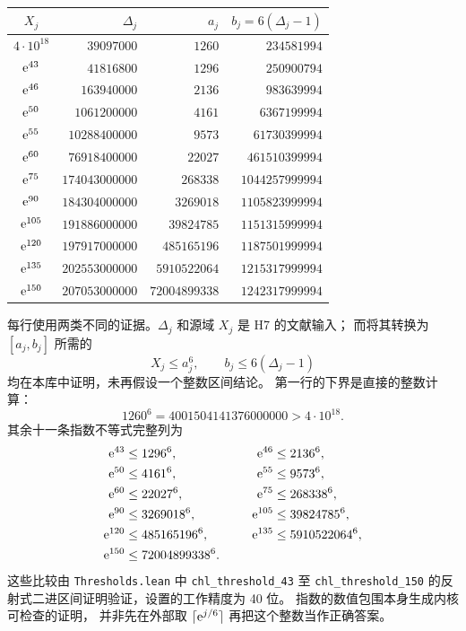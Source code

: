 \begin{center}
\small
\begin{tabular}{c|r|r|r}
$X_j$ & $\Delta_j$ & $a_j$ & $b_j=6(\Delta_j-1)$\\\hline
$4\cdot10^{18}$ & $39097000$ & $1260$ & $234581994$\\
$\mathrm e^{43}$ & $41816800$ & $1296$ & $250900794$\\
$\mathrm e^{46}$ & $163940000$ & $2136$ & $983639994$\\
$\mathrm e^{50}$ & $1061200000$ & $4161$ & $6367199994$\\
$\mathrm e^{55}$ & $10288400000$ & $9573$ & $61730399994$\\
$\mathrm e^{60}$ & $76918400000$ & $22027$ & $461510399994$\\
$\mathrm e^{75}$ & $174043000000$ & $268338$ & $1044257999994$\\
$\mathrm e^{90}$ & $184304000000$ & $3269018$ & $1105823999994$\\
$\mathrm e^{105}$ & $191886000000$ & $39824785$ & $1151315999994$\\
$\mathrm e^{120}$ & $197917000000$ & $485165196$ & $1187501999994$\\
$\mathrm e^{135}$ & $202553000000$ & $5910522064$ & $1215317999994$\\
$\mathrm e^{150}$ & $207053000000$ & $72004899338$ & $1242317999994$
\end{tabular}
\end{center}

每行使用两类不同的证据。$\Delta_j$ 和源域 $X_j$ 是 H7 的文献输入；
而将其转换为 $[a_j,b_j]$ 所需的
\begin{equation}\label{lower:threshold-checks}
 X_j\leq a_j^6,\qquad b_j\leq6(\Delta_j-1)
\end{equation}
均在本库中证明，未再假设一个整数区间结论。
第一行的下界是直接的整数计算：
\[
 1260^6=4001504141376000000>4\cdot10^{18}.
\]
其余十一条指数不等式完整列为
\begin{alignat}{2}
 \mathrm e^{43}&\leq1296^6,&\qquad \mathrm e^{46}&\leq2136^6,\notag\\
 \mathrm e^{50}&\leq4161^6,& \mathrm e^{55}&\leq9573^6,\notag\\
 \mathrm e^{60}&\leq22027^6,& \mathrm e^{75}&\leq268338^6,\notag\\
 \mathrm e^{90}&\leq3269018^6,& \mathrm e^{105}&\leq39824785^6,\notag\\
 \mathrm e^{120}&\leq485165196^6,&
 \mathrm e^{135}&\leq5910522064^6,\notag\\
 \mathrm e^{150}&\leq72004899338^6.&&
 \label{lower:eleven-exp-thresholds}
\end{alignat}
这些比较由 \texttt{Thresholds.lean} 中
\texttt{chl\_threshold\_43} 至 \texttt{chl\_threshold\_150}
的反射式二进区间证明验证，设置的工作精度为 40 位。
指数的数值包围本身生成内核可检查的证明，
并非先在外部取 $\lceil\mathrm e^{j/6}\rceil$ 再把这个整数当作正确答案。

